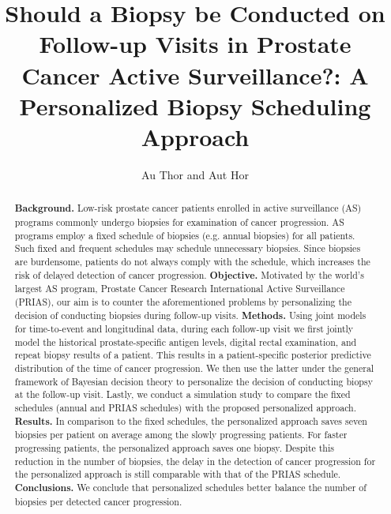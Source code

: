\documentclass[Afour,sagev,times]{sagej}
\begin{document}

\title{Should a Biopsy be Conducted on Follow-up Visits in Prostate Cancer Active Surveillance?: A Personalized Biopsy Scheduling Approach}

\author{Au Thor and Aut Hor}




\begin{abstract}
\textbf{Background.} Low-risk prostate cancer patients enrolled in active surveillance (AS) programs commonly undergo biopsies for examination of cancer progression. AS programs employ a fixed schedule of biopsies (e.g. annual biopsies) for all patients. Such fixed and frequent schedules may schedule unnecessary biopsies. Since biopsies are burdensome, patients do not always comply with the schedule, which increases the risk of delayed detection of cancer progression. \textbf{Objective.} Motivated by the world's largest AS program, Prostate Cancer Research International Active Surveillance (PRIAS), our aim is to counter the aforementioned problems by personalizing the decision of conducting biopsies during follow-up visits. \textbf{Methods.} Using joint models for time-to-event and longitudinal data, during each follow-up visit we first jointly model the historical prostate-specific antigen levels, digital rectal examination, and repeat biopsy results of a patient. This results in a patient-specific posterior predictive distribution of the time of cancer progression. We then use the latter under the general framework of Bayesian decision theory to personalize the decision of conducting biopsy at the follow-up visit. Lastly, we conduct a simulation study to compare the fixed schedules (annual and PRIAS schedules) with the proposed personalized approach. \textbf{Results.} In comparison to the fixed schedules, the personalized approach saves seven biopsies per patient on average among the slowly progressing patients. For faster progressing patients, the personalized approach saves one biopsy. Despite this reduction in the number of biopsies, the delay in the detection of cancer progression for the personalized approach is still comparable with that of the PRIAS schedule. \textbf{Conclusions.} We conclude that personalized schedules better balance the number of biopsies per detected cancer progression.
\end{abstract}
\end{document}
